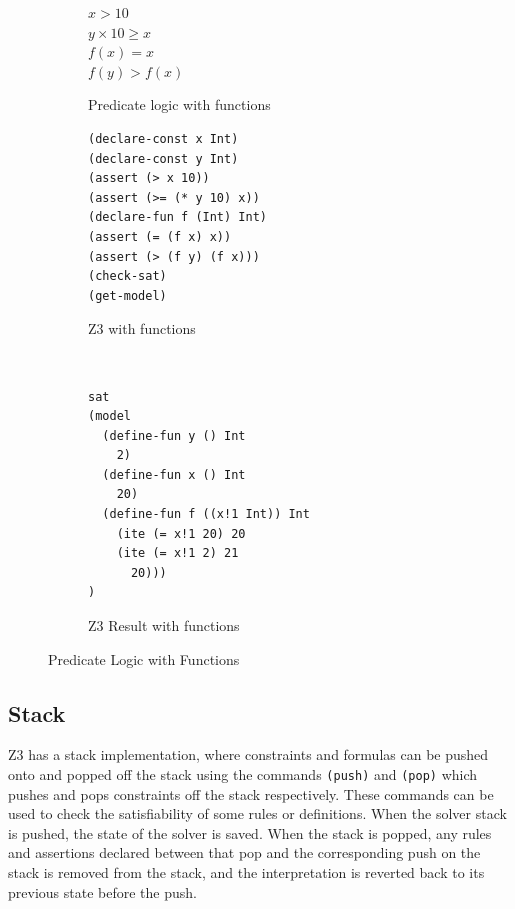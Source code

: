 \documentclass[a4paper]{report}
\begin{document}
\begin{figure}[!htbp]
\centering
\begin{subfigure}[b]{\textwidth}
\centering
$x > 10$ \\
$y \times 10 \geq x$ \\
$f(x) = x$ \\
$f(y) > f(x)$
\caption{Predicate logic with functions}
\label{fig:Predicate logic with functions}
\end{subfigure}
\begin{subfigure}[b]{\textwidth}
\lstset{numbers=left, showspaces=false,
    showstringspaces=false, tabsize=2, breaklines=true,
    xleftmargin=5.0ex,
}
\lstset{basicstyle=\ttfamily}
\centering
\begin{lstlisting}[frame=single]
(declare-const x Int)
(declare-const y Int)
(assert (> x 10))
(assert (>= (* y 10) x))
(declare-fun f (Int) Int)
(assert (= (f x) x))
(assert (> (f y) (f x)))
(check-sat)
(get-model)
\end{lstlisting}
\caption{Z3 with functions}
\label{fig:Z3 with functions}
\end{subfigure}\\
\begin{subfigure}[b]{\textwidth}
\lstset{basicstyle=\ttfamily}
\begin{lstlisting}[frame=single]
sat
(model 
  (define-fun y () Int
    2)
  (define-fun x () Int
    20)
  (define-fun f ((x!1 Int)) Int
    (ite (= x!1 20) 20
    (ite (= x!1 2) 21
      20)))
)
\end{lstlisting}
\caption{Z3 Result with functions}
\label{fig:Z3 Function Result}
\end{subfigure}
\caption{Predicate Logic with Functions}
\label{fig:Predicate Logic with Functions}
\end{figure} 

\newpage

\subsection{Stack}
Z3 has a stack implementation, where constraints and formulas can be pushed onto and popped off the stack using the commands \texttt{(push)} and \texttt{(pop)} which pushes and pops constraints off the stack respectively. These commands can be used to check the satisfiability of some rules or definitions. When the solver stack is pushed, the state of the solver is saved. When the stack is popped, any rules and assertions declared between that pop and the corresponding push on the stack is removed from the stack, and the interpretation is reverted back to its previous state before the push.\\
\end{document}
